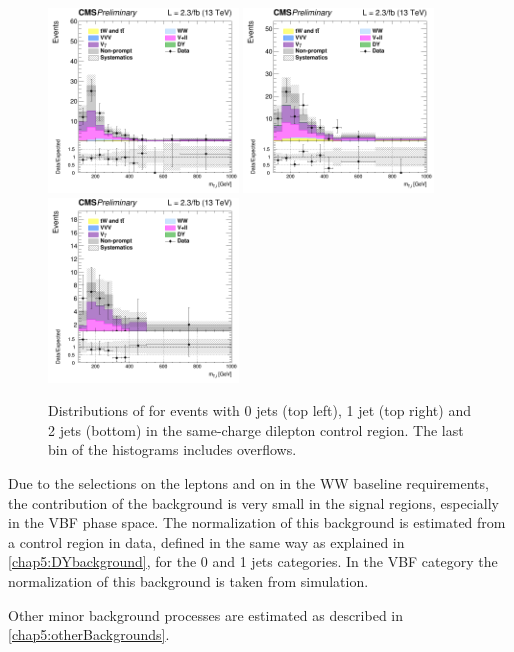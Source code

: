\begin{figure}[htb]
\centering
\includegraphics[width=0.45\textwidth]{images/13TeV/HighMass/cratio_hww2l2v_13TeV_ss_of0j_mTi_0j.png}
\includegraphics[width=0.45\textwidth]{images/13TeV/HighMass/cratio_hww2l2v_13TeV_ss_of1j_mTi_1j.png}
\includegraphics[width=0.45\textwidth]{images/13TeV/HighMass/cratio_hww2l2v_13TeV_ss_of2j_mTi_VBF.png}
\caption{
Distributions of \mti for events with 0 jets (top left), 1 jet (top right) and 2 jets (bottom) in the same-charge dilepton
control region. The last bin of the histograms includes overflows. %
}
\label{fig:13TeV_hm_samesign}
\end{figure}

Due to the selections on the leptons \pt and on \mll in the WW baseline requirements, the contribution of the \dytt background is very small in the signal regions, especially in the VBF phase space. The normalization of this background is estimated from a control region in data, defined in the same way as explained in \ref{chap5:DYbackground}, for the 0 and 1 jets categories. In the VBF category the normalization of this background is taken from simulation.

Other minor background processes are estimated as described in \ref{chap5:otherBackgrounds}.













